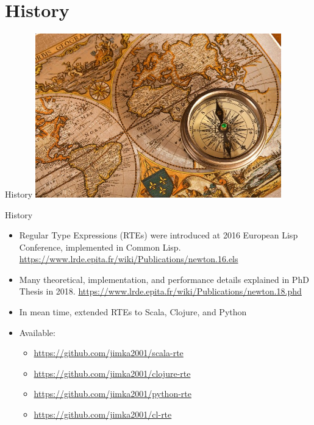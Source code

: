 \section{History}
\begin{frame}{History}
  \centering
  \includegraphics[width=0.8\textwidth]{history.jpg}
\end{frame}

\begin{frame}{History}
  \begin{itemize}
  \item Regular Type Expressions (RTEs) were introduced at 2016 European Lisp Conference, implemented in Common Lisp.
    \url{https://www.lrde.epita.fr/wiki/Publications/newton.16.els}
  \item Many theoretical, implementation, and performance details explained in PhD Thesis in 2018.
    \url{https://www.lrde.epita.fr/wiki/Publications/newton.18.phd}
  \item In mean time, extended RTEs to Scala, Clojure, and Python
  \item Available:
    \begin{itemize}
    \item \url{https://github.com/jimka2001/scala-rte}
    \item \url{https://github.com/jimka2001/clojure-rte}
    \item \url{https://github.com/jimka2001/python-rte}
    \item \url{https://github.com/jimka2001/cl-rte}
    \end{itemize}
  \end{itemize}
\end{frame}


